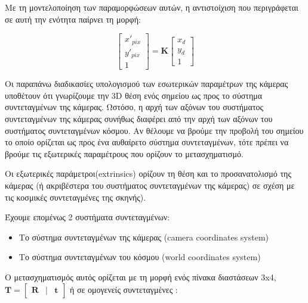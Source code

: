 Με τη μοντελοποίηση των παραμορφώσεων αυτών, η αντιστοίχιση που περιγράφεται σε αυτή την ενότητα παίρνει τη μορφή:


\begin{equation}
\begin{bmatrix}
x'_{pix}\\y'_{pix}\\1
\end{bmatrix}
=
\mathbf{K}
\begin{bmatrix}
x_{d}\\
y_{d}\\
1
\end{bmatrix}
\end{equation}





Οι παραπάνω διαδικασίες υπολογισμού των εσωτερικών παραμέτρων της κάμερας υποθέτουν ότι γνωρίζουμε την 3D θέση ενός σημείου ως προς το σύστημα συντεταγμένων της κάμερας. Ωστόσο, η αρχή των αξόνων του συστήματος συντεταγμένων της κάμερας συνήθως διαφέρει από την αρχή των αξόνων του συστήματος συντεταγμένων κόσμου. Αν θέλουμε να βρούμε την προβολή του σημείου το οποίο ορίζεται ως προς ένα αυθαίρετο σύστημα συντεταγμένων, τότε πρέπει να βρούμε τις εξωτερικές παραμέτρους που ορίζουν το μετασχηματισμό. 


Οι εξωτερικές παράμετροι(extrinsics) ορίζουν τη θέση και το προσανατολισμό της κάμερας (ή ακριβέστερα του συστήματος συντεταγμένων της κάμερας) σε σχέση με τις κοσμικές συντεταγμένες της σκηνής). 

Έχουμε επομένως 2 συστήματα συντεταγμένων:

\begin{itemize}
\item Το σύστημα συντεταγμένων της κάμερας (camera coordinates system)
\item Το σύστημα συντεταγμένων του κόσμου (world coordinates system)
\end{itemize}



Ο μετασχηματισμός αυτός ορίζεται με τη μορφή ενός πίνακα διαστάσεων 3x4, $\mathbf{T}=\begin{bmatrix}\mathbf{R} & | & \!\mathbf{t}\end{bmatrix}$ ή σε ομογενείς συντεταγμένες :

